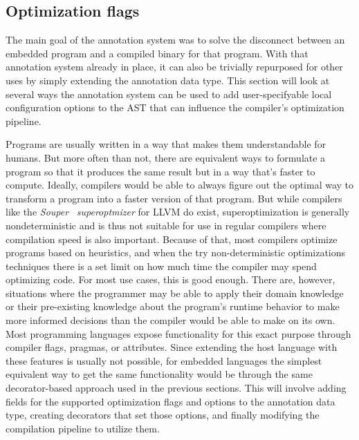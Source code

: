\documentclass[fontsize=11pt,a4paper,parskip=half,numbers=noenddot]{scrartcl}
\newcommand{\hask}[1]{\texttt{#1}}
\begin{document}
\subsection{Optimization flags}\label{sec:optimizations}


The main goal of the annotation system was to solve the disconnect between an
embedded program and a compiled binary for that program. With that annotation
system already in place, it can also be trivially repurposed for other uses by
simply extending the annotation data type. This section will look at several
ways the annotation system can be used to add user-specifyable local
configuration options to the AST that can influence the compiler's optimization
pipeline.

Programs are usually written in a way that makes them understandable for humans.
But more often than not, there are equivalent ways to formulate a program so
that it produces the same result but in a way that's faster to compute. Ideally,
compilers would be able to always figure out the optimal way to transform a
program into a faster version of that program. But while compilers like the
\emph{Souper}~\cite{sasnauskas2017souper} \emph{superoptmizer} for LLVM do
exist, superoptimization is generally nondeterministic and is thus not suitable
for use in regular compilers where compilation speed is also important. Because
of that, most compilers optimize programs based on heuristics, and when the try
non-deterministic optimizations techniques there is a set limit on how much time
the compiler may spend optimizing code. For most use cases, this is good enough.
There are, however, situations where the programmer may be able to apply their
domain knowledge or their pre-existing knowledge about the program's runtime
behavior to make more informed decisions than the compiler would be able to make
on its own. Most programming languages expose functionality for this exact
purpose through compiler flags, pragmas, or attributes. Since extending the host
language with these features is usually not possible, for embedded languages the
simplest equivalent way to get the same functionality would be through the same
decorator-based approach used in the previous sections. This will involve adding
fields for the supported optimization flags and options to the annotation data
type, creating decorators that set those options, and finally modifying the
compilation pipeline to utilize them.
\end{document}
